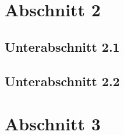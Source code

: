 \section{Abschnitt 2}


\subsection{Unterabschnitt 2.1}


\subsection{Unterabschnitt 2.2}


\section{Abschnitt 3}
